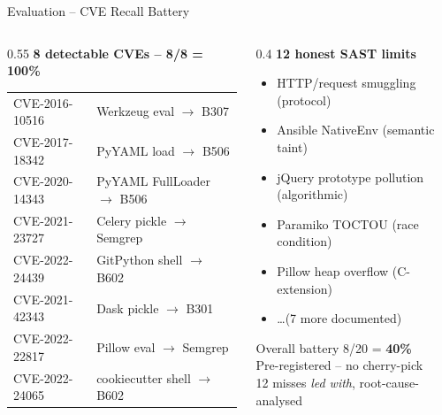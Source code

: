 \documentclass[aspectratio=169,12pt]{beamer}
\newcommand{\good}[1]{\textbf{\color{acrGreen}#1}}
\begin{document}
\begin{frame}{Evaluation -- CVE Recall Battery}
  \begin{columns}[T]
    \begin{column}{0.55\textwidth}
      \textbf{8 detectable CVEs -- \good{8/8 = 100\%}}
      \vspace{2pt}
      \begin{tabular}{ll}
        \tiny CVE-2016-10516 & \tiny Werkzeug eval \(\rightarrow\) B307 \\
        \tiny CVE-2017-18342 & \tiny PyYAML load \(\rightarrow\) B506 \\
        \tiny CVE-2020-14343 & \tiny PyYAML FullLoader \(\rightarrow\) B506 \\
        \tiny CVE-2021-23727 & \tiny Celery pickle \(\rightarrow\) Semgrep \\
        \tiny CVE-2022-24439 & \tiny GitPython shell \(\rightarrow\) B602 \\
        \tiny CVE-2021-42343 & \tiny Dask pickle \(\rightarrow\) B301 \\
        \tiny CVE-2022-22817 & \tiny Pillow eval \(\rightarrow\) Semgrep \\
        \tiny CVE-2022-24065 & \tiny cookiecutter shell \(\rightarrow\) B602 \\
      \end{tabular}
    \end{column}
    \begin{column}{0.4\textwidth}
      \textbf{12 honest SAST limits}
      \begin{itemize}\tiny
        \item HTTP/request smuggling (protocol)
        \item Ansible NativeEnv (semantic taint)
        \item jQuery prototype pollution (algorithmic)
        \item Paramiko TOCTOU (race condition)
        \item Pillow heap overflow (C-extension)
        \item \ldots (7 more documented)
      \end{itemize}
      \vspace{6pt}
      \begin{exampleblock}{\small Overall battery}
        8/20 = \textbf{40\%}\\
        Pre-registered -- no cherry-pick\\
        12 misses \emph{led with}, root-cause-analysed
      \end{exampleblock}
    \end{column}
  \end{columns}
\end{frame}
\end{document}
